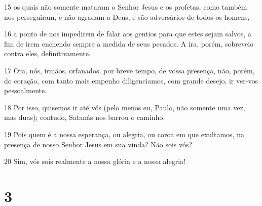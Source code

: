 \par 15 os quais não somente mataram o Senhor Jesus e os profetas, como também nos perseguiram, e não agradam a Deus, e são adversários de todos os homens,
\par 16 a ponto de nos impedirem de falar aos gentios para que estes sejam salvos, a fim de irem enchendo sempre a medida de seus pecados. A ira, porém, sobreveio contra eles, definitivamente.
\par 17 Ora, nós, irmãos, orfanados, por breve tempo, de vossa presença, não, porém, do coração, com tanto mais empenho diligenciamos, com grande desejo, ir ver-vos pessoalmente.
\par 18 Por isso, quisemos ir até vós (pelo menos eu, Paulo, não somente uma vez, mas duas); contudo, Satanás nos barrou o caminho.
\par 19 Pois quem é a nossa esperança, ou alegria, ou coroa em que exultamos, na presença de nosso Senhor Jesus em sua vinda? Não sois vós?
\par 20 Sim, vós sois realmente a nossa glória e a nossa alegria!

\chapter{3}

